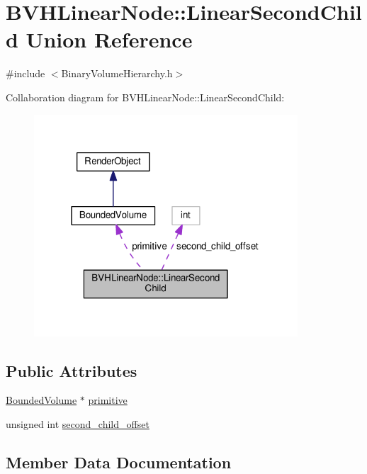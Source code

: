 \hypertarget{unionBVHLinearNode_1_1LinearSecondChild}{}\section{B\+V\+H\+Linear\+Node\+:\+:Linear\+Second\+Child Union Reference}
\label{unionBVHLinearNode_1_1LinearSecondChild}


{\ttfamily \#include $<$Binary\+Volume\+Hierarchy.\+h$>$}



Collaboration diagram for B\+V\+H\+Linear\+Node\+:\+:Linear\+Second\+Child\+:\nopagebreak
\begin{figure}[H]
\begin{center}
\leavevmode
\includegraphics[width=279pt]{unionBVHLinearNode_1_1LinearSecondChild__coll__graph}
\end{center}
\end{figure}
\subsection*{Public Attributes}
\begin{DoxyCompactItemize}
\item 
\hyperlink{classBoundedVolume}{Bounded\+Volume} $\ast$ \hyperlink{unionBVHLinearNode_1_1LinearSecondChild_ac8489c14e68bc1f8fee2cdf842199e61}{primitive}
\item 
unsigned int \hyperlink{unionBVHLinearNode_1_1LinearSecondChild_ac0a41d4aa3236a1f51741467112ee9ba}{second\+\_\+child\+\_\+offset}
\end{DoxyCompactItemize}


\subsection{Member Data Documentation}
